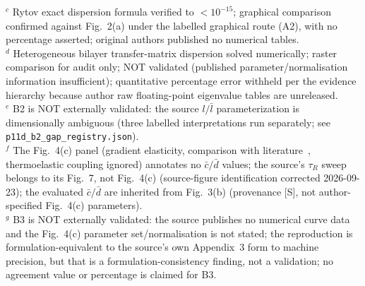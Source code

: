 \begin{table}[t]
\begin{flushleft}
$^c$ Rytov exact dispersion formula verified to $< 10^{-15}$; graphical comparison confirmed against Fig.~2(a) under the labelled graphical route (A2), with no percentage asserted; original authors published no numerical tables.\\
$^d$ Heterogeneous bilayer transfer-matrix dispersion solved numerically; raster comparison for audit only; NOT validated (published parameter/normalisation information insufficient); quantitative percentage error withheld per the evidence hierarchy because author raw floating-point eigenvalue tables are unreleased.\\
$^e$ B2 is NOT externally validated: the source $l/\bar{l}$ parameterization is dimensionally ambiguous (three labelled interpretations run separately; see \texttt{p11d\_b2\_gap\_registry.json}).\\
$^f$ The Fig.~4(c) panel (gradient elasticity, comparison with literature~\cite{liweizhou2016}, thermoelastic coupling ignored) annotates no $\bar{c}/\bar{d}$ values; the source's $\tau_R$ sweep belongs to its Fig.~7, not Fig.~4(c) (source-figure identification corrected 2026-09-23); the evaluated $\bar{c}/\bar{d}$ are inherited from Fig.~3(b) (provenance [S], not author-specified Fig.~4(c) parameters).\\
$^g$ B3 is NOT externally validated: the source publishes no numerical curve data and the Fig.~4(c) parameter set/normalisation is not stated; the reproduction is formulation-equivalent to the source's own Appendix~3 form to machine precision, but that is a formulation-consistency finding, not a validation; no agreement value or percentage is claimed for B3.\\
\end{flushleft}
\end{table}
